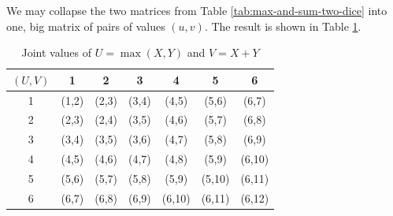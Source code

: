 \documentclass[captions=tableheading]{scrbook}
\begin{document}
\begin{example}
\begin{table}
\hfill{}\hfill{}\hfill{}
\caption{Maximum \(U\) and sum \(V\) of a pair of dice rolls \((X,Y)\)\label{tab:max-and-sum-two-dice}}
\end{table}

We may collapse the two matrices from Table \ref{tab:max-and-sum-two-dice} into one, big matrix of pairs of values \((u,v)\). The result is shown in Table \ref{tab:-max-sum-two-dice-joint}. 

\begin{table}
\begin{centering}
\begin{tabular}{c|cccccc}
\((U,V)\) & 1 & 2 & 3 & 4 & 5 & 6\tabularnewline
\hline
1 & (1,2) & (2,3) & (3,4) & (4,5) & (5,6) & (6,7)\tabularnewline
2 & (2,3) & (2,4) & (3,5) & (4,6) & (5,7) & (6,8)\tabularnewline
3 & (3,4) & (3,5) & (3,6) & (4,7) & (5,8) & (6,9)\tabularnewline
4 & (4,5) & (4,6) & (4,7) & (4,8) & (5,9) & (6,10)\tabularnewline
5 & (5,6) & (5,7) & (5,8) & (5,9) & (5,10) & (6,11)\tabularnewline
6 & (6,7) & (6,8) & (6,9) & (6,10) & (6,11) & (6,12)\tabularnewline
\end{tabular}
\par\end{centering}
\caption{Joint values of \(U=\max(X,Y)\) and \(V=X+Y\)\label{tab:-max-sum-two-dice-joint}}
\end{table}


\end{example}
\end{document}
